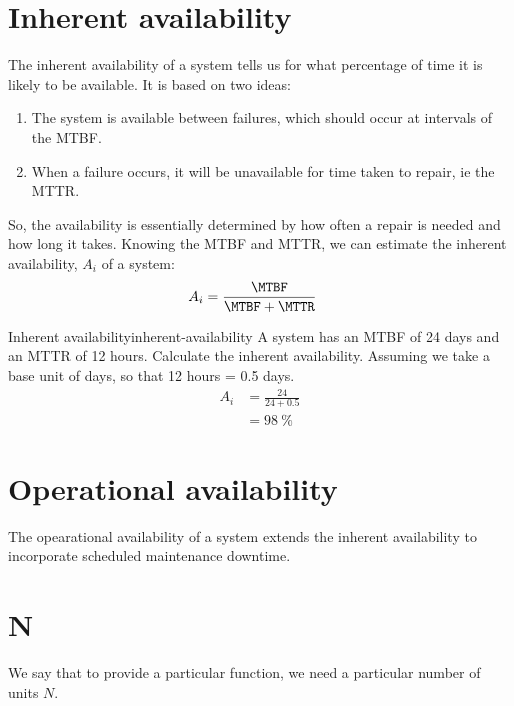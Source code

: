 \documentclass{pgnotes}
\begin{document}
\section{Inherent availability}
The inherent availability of a system tells us for what percentage of time it is likely to be available.
It is based on two ideas:
\begin{enumerate}
\item The system is available between failures, which should occur at intervals of the MTBF.
\item When a failure occurs, it will be unavailable for time taken to repair, ie the MTTR.
\end{enumerate}
So, the availability is essentially determined by how often a repair is needed and how long it takes.
Knowing the MTBF and MTTR, we can estimate the inherent availability, $A_i$ of a system:
\begin{align}
  A_i & = \frac{\MTBF}{\MTBF+\MTTR}
\end{align}
\begin{example}{Inherent availability}{inherent-availability}
  A system has an MTBF of 24 days and an MTTR of 12 hours.
  Calculate the inherent availability.
  \tcblower
  Assuming we take a base unit of days, so that 12 hours = 0.5 days.
  \begin{align}
    A_i & = \frac{24}{24 + 0.5} \\
        & = \SI{98}{\percent}
  \end{align}
\end{example}


\section{Operational availability}

The opearational availability of a system extends the inherent availability to incorporate scheduled maintenance downtime. 


\label{ch:redundancy}

\section{N}

We say that to provide a particular function, we need a particular number of units $N$. 
\end{document}
